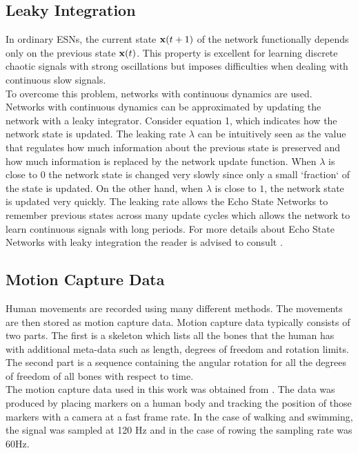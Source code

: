 \documentclass[letterpaper,9pt]{article}
\begin{document}
\subsection{Leaky Integration}

In ordinary ESNs, the current state ${\bf x}(t+1)$ of the network functionally depends only on the previous state ${\bf x}(t)$. This property is excellent for learning discrete chaotic signals with strong oscillations but imposes difficulties when dealing with continuous slow signals.\\

To overcome this problem, networks with continuous dynamics are used. Networks with continuous dynamics can be approximated by updating the network with a leaky integrator. Consider equation 1, which indicates how the network state is updated. The leaking rate $\lambda$ can be intuitively seen as the value that regulates how much information about the previous state is preserved and how much information is replaced by the network update function. When $\lambda$ is close to $0$ the network state is changed very slowly since only a small `fraction` of the state is updated. On the other hand, when $\lambda$ is close to $1$, the network state is updated very quickly. The leaking rate allows the Echo State Networks to remember previous states across many update cycles which allows the network to learn continuous signals with long periods. For more details about Echo State Networks with leaky integration the reader is advised to consult \cite{JaegerESNTutorial}.

\subsection{Motion Capture Data}

Human movements are recorded using many different methods. The movements are then stored as motion capture data. Motion capture data typically consists of two parts. The first is a skeleton which lists all the bones that the human has with additional meta-data such as length, degrees of freedom and rotation limits. The second part is a sequence containing the angular rotation for all the degrees of freedom of all bones with respect to time.\\

The motion capture data used in this work was obtained from \cite{CMUMocap}. The data was produced by placing markers on a human body and tracking the position of those markers with a camera at a fast frame rate. In the case of walking and swimming, the signal was sampled at 120 Hz and in the case of rowing the sampling rate was 60Hz. 
\end{document}
